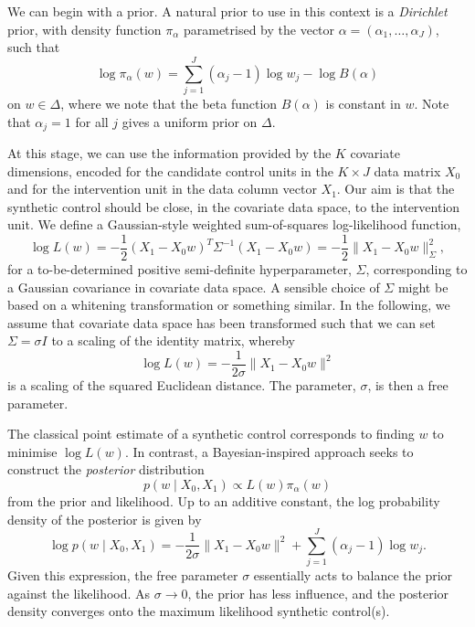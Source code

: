 \documentclass[a4paper, 12pt, onecolumn, singlepage]{article}
\begin{document}
We can begin with a prior.
A natural prior to use in this context is a \emph{Dirichlet} prior,
with density function $\pi_\alpha$ parametrised by the vector $\alpha = (\alpha_1, \dots, \alpha_J)$,
such that
\[
\log \pi_\alpha(w) = \sum_{j=1}^J (\alpha_j - 1) \log w_j - \log B(\alpha)
\]
on $w \in \Delta$, where we note that the beta function $B(\alpha)$ is constant in $w$.
Note that $\alpha_j = 1$ for all $j$ gives a uniform prior on $\Delta$.

At this stage, we can use the information provided by the $K$ covariate dimensions,
encoded for the candidate control units in the $K \times J$ data matrix $X_0$
and for the intervention unit in the data column vector $X_1$.
Our aim is that the synthetic control should be close,
in the covariate data space, to the intervention unit.
We define a Gaussian-style weighted sum-of-squares log-likelihood function,
\[
\log L(w) = -\frac{1}{2} (X_1 - X_0 w)^T \Sigma^{-1} (X_1 - X_0 w) = -\frac{1}{2} \| X_1 - X_0 w \|_\Sigma^2,
\]
for a to-be-determined positive semi-definite hyperparameter, $\Sigma$,
corresponding to a Gaussian covariance in covariate data space.
A sensible choice of $\Sigma$ might be based on a whitening transformation or something similar.
In the following, we assume that covariate data space has been transformed
such that we can set $\Sigma = \sigma I$ to a scaling of the identity matrix,
whereby
\begin{equation}
\label{eq:lh}
\log L(w) = -\frac{1}{2\sigma} \| X_1 - X_0 w \|^2
\end{equation}
is a scaling of the squared Euclidean distance.
The parameter, $\sigma$, is then a free parameter.

The classical point estimate of a synthetic control corresponds to finding $w$ to minimise $\log L(w)$.
In contrast, a Bayesian-inspired approach seeks to construct the \emph{posterior} distribution
\[
p(w \mid X_0, X_1) \propto L(w) \pi_\alpha(w)
\]
from the prior and likelihood.
Up to an additive constant,
the log probability density of the posterior is given by
\[
\log p(w \mid X_0, X_1) = -\frac{1}{2\sigma} \| X_1 - X_0 w \|^2 + \sum_{j=1}^J (\alpha_j - 1) \log w_j.
\]
Given this expression, the free parameter $\sigma$
essentially acts to balance the prior against the likelihood.
As $\sigma \rightarrow 0$, the prior has less influence, 
and the posterior density converges onto the maximum likelihood synthetic control(s).
\end{document}
